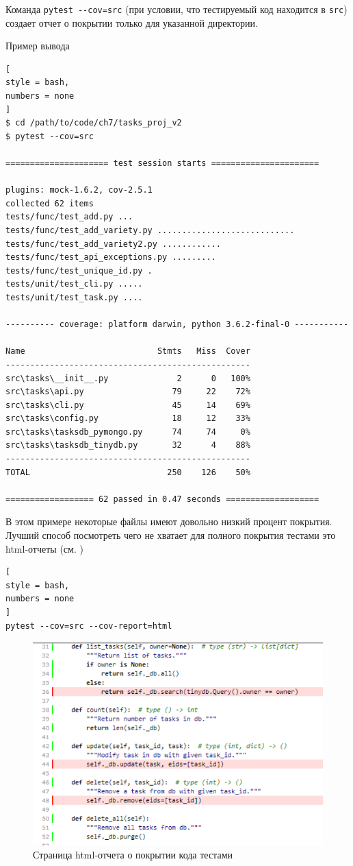 \documentclass[%
	11pt,
	a4paper,
	utf8,
		]{article}
\begin{document}
Команда \verb|pytest --cov=src| (при условии, что тестируемый код находится в \texttt{src}) создает отчет о покрытии только для указанной директории.

Пример вывода
\begin{lstlisting}[
style = bash,
numbers = none
]
$ cd /path/to/code/ch7/tasks_proj_v2
$ pytest --cov=src

===================== test session starts ======================

plugins: mock-1.6.2, cov-2.5.1
collected 62 items
tests/func/test_add.py ...
tests/func/test_add_variety.py ............................
tests/func/test_add_variety2.py ............
tests/func/test_api_exceptions.py .........
tests/func/test_unique_id.py .
tests/unit/test_cli.py .....
tests/unit/test_task.py ....

---------- coverage: platform darwin, python 3.6.2-final-0 -----------

Name                           Stmts   Miss  Cover
--------------------------------------------------
src\tasks\__init__.py              2      0   100%
src\tasks\api.py                  79     22    72%
src\tasks\cli.py                  45     14    69%
src\tasks\config.py               18     12    33%
src\tasks\tasksdb_pymongo.py      74     74     0%
src\tasks\tasksdb_tinydb.py       32      4    88%
--------------------------------------------------
TOTAL                            250    126    50%

================== 62 passed in 0.47 seconds ===================
\end{lstlisting}

В этом примере некоторые файлы имеют довольно низкий процент покрытия. Лучший способ посмотреть чего не хватает для полного покрытия тестами это html-отчеты (см. )
\begin{lstlisting}[
style = bash,
numbers = none	
]
pytest --cov=src --cov-report=html
\end{lstlisting} 

\begin{figure}[h]
	\centering
	\includegraphics[scale=0.85]{figures/pytest_cov_html.png}
	\caption{ Страница html-отчета о покрытии кода тестами }\label{fig:pytest_cov_html}
\end{figure}
\end{document}
